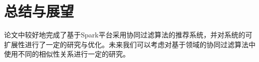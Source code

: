 \chapter{总结与展望}
论文中较好地完成了基于Spark平台采用协同过滤算法的推荐系统，并对系统的可扩展性进行了一定的研究与优化。未来我们可以考虑对基于领域的协同过滤算法中使用不同的相似性关系进行一定的研究。

